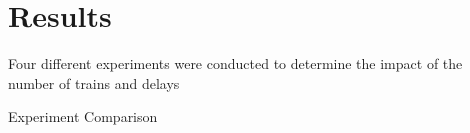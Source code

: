 \section{Results}

Four different experiments were conducted to determine the impact of the number
of trains and delays 

\begin{sidewaystable}
    \centering
    \caption{Experiment Comparison}
    
\end{sidewaystable}

